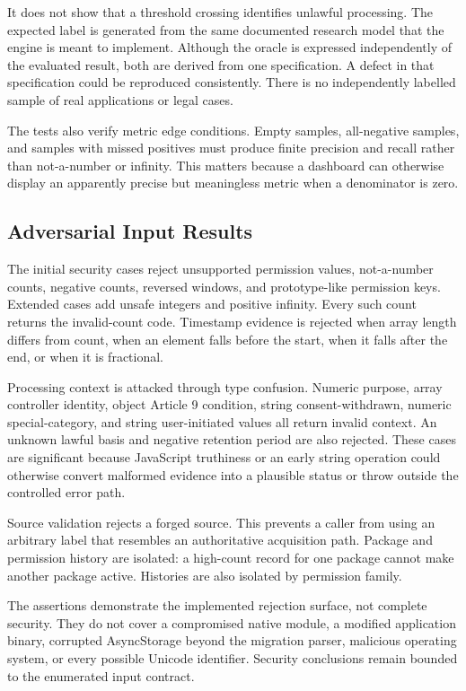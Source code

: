 It does not show that a threshold crossing identifies unlawful processing. The expected label is generated from the same documented research model that the engine is meant to implement. Although the oracle is expressed independently of the evaluated result, both are derived from one specification. A defect in that specification could be reproduced consistently. There is no independently labelled sample of real applications or legal cases.

The tests also verify metric edge conditions. Empty samples, all-negative samples, and samples with missed positives must produce finite precision and recall rather than not-a-number or infinity. This matters because a dashboard can otherwise display an apparently precise but meaningless metric when a denominator is zero.

\subsection{Adversarial Input Results}

The initial security cases reject unsupported permission values, not-a-number counts, negative counts, reversed windows, and prototype-like permission keys. Extended cases add unsafe integers and positive infinity. Every such count returns the invalid-count code. Timestamp evidence is rejected when array length differs from count, when an element falls before the start, when it falls after the end, or when it is fractional.

Processing context is attacked through type confusion. Numeric purpose, array controller identity, object Article 9 condition, string consent-withdrawn, numeric special-category, and string user-initiated values all return invalid context. An unknown lawful basis and negative retention period are also rejected. These cases are significant because JavaScript truthiness or an early string operation could otherwise convert malformed evidence into a plausible status or throw outside the controlled error path.

Source validation rejects a forged source. This prevents a caller from using an arbitrary label that resembles an authoritative acquisition path. Package and permission history are isolated: a high-count record for one package cannot make another package active. Histories are also isolated by permission family.

The assertions demonstrate the implemented rejection surface, not complete security. They do not cover a compromised native module, a modified application binary, corrupted AsyncStorage beyond the migration parser, malicious operating system, or every possible Unicode identifier. Security conclusions remain bounded to the enumerated input contract.

